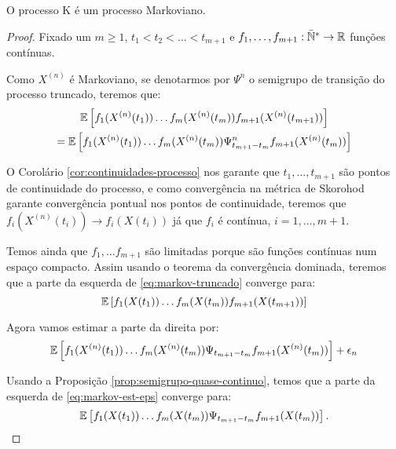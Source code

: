 \begin{teorema}
  \label{teo:proc_markov}
  O processo K é um processo Markoviano.
\end{teorema}

\begin{proof}
  Fixado um $m \geq 1$, $t_1 < t_2 < \ldots < t_{m+1}$ e $f_1, \ldots,
  f_{m+1} : {\mathbb{\bar{N}^*}} \to {\mathbb{R}}$ funções contínuas.

  Como $X^{(n)}$ é Markoviano, se denotarmos por $\Psi^n$ o semigrupo
  de transição do processo truncado, teremos que:
  \begin{gather}
    \label{eq:markov-truncado}
    {\mathbb{E}} \left[
      f_{1}(X^{(n)}(t_{1})) 
      \ldots
      f_{m}(X^{(n)}(t_{m})) 
      f_{m+1}(X^{(n)}(t_{m+1})) 
    \right] \\
    = {\mathbb{E}} \left[
      f_{1}(X^{(n)}(t_{1})) 
      \ldots
      f_{m}(X^{(n)}(t_{m})) 
      \Psi^n_{t_{m+1} - t_{m}} f_{m+1} (X^{(n)}(t_{m})) 
    \right]\notag
  \end{gather}

  O Corolário \ref{cor:continuidades-processo} nos garante que \qc
  $t_1, \ldots, t_{m+1}$ são pontos de continuidade do processo, e
  como convergência na métrica de Skorohod garante convergência
  pontual nos pontos de continuidade, teremos que $f_i(X^{(n)}(t_i)) \to
  f_i(X(t_i))$ \qc já que $f_i$ é contínua, $i = 1, \ldots, m+1$.

  Temos ainda que $f_1, \ldots f_{m+1}$ são limitadas porque são
  funções contínuas num espaço compacto. Assim usando o teorema da
  convergência dominada, teremos que a parte da esquerda de
  \eqref{eq:markov-truncado} converge para:
  \begin{displaymath}
    {\mathbb{E}} \left[
      f_{1}(X(t_{1})) 
      \ldots
      f_{m}(X(t_{m})) 
      f_{m+1}(X(t_{m+1})) 
    \right]
  \end{displaymath}

  Agora vamos estimar a parte da direita por:
  \begin{equation}
    \label{eq:markov-est-eps}
    {\mathbb{E}} \left[
      f_{1}(X^{(n)}(t_{1})) 
      \ldots
      f_{m}(X^{(n)}(t_{m})) 
      \Psi_{t_{m+1} - t_{m}} f_{m+1} (X^{(n)}(t_{m})) 
    \right] + \epsilon_n
  \end{equation}

  Usando a Proposição \ref{prop:semigrupo-quase-continuo}, temos que a
  parte da esquerda de \eqref{eq:markov-est-eps} converge para:
  \begin{displaymath}
    {\mathbb{E}} \left[
      f_{1}(X(t_{1})) 
      \ldots
      f_{m}(X(t_{m})) 
      \Psi_{t_{m+1} - t_{m}} f_{m+1} (X(t_{m})) 
    \right].
  \end{displaymath}


\end{proof}
